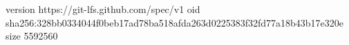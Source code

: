 version https://git-lfs.github.com/spec/v1
oid sha256:328bb0334044f0beb17ad78ba518afda263d0225383f32fd77a18b43b17e320e
size 5592560
